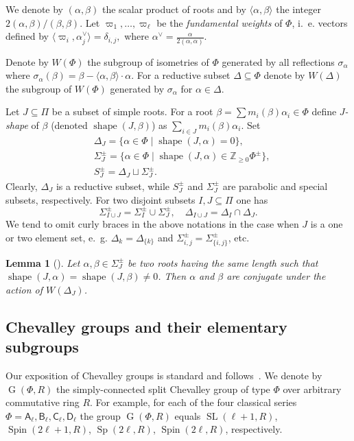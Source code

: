 \documentclass[12pt]{amsart}
\theoremstyle{plain}
\numberwithin{equation}{section}
\newtheorem{lemma}{Lemma}
\numberwithin{lemma}{section}
\theoremstyle{definition}
\theoremstyle{remark}
\DeclareMathOperator{\G}{G}
\DeclareMathOperator{\SL}{SL}
\DeclareMathOperator{\Sp}{Sp}
\DeclareMathOperator{\shape}{shape}
\DeclareMathOperator{\Spin}{Spin}
\newcommand{\rA}{\mathsf{A}}
\newcommand{\rB}{\mathsf{B}}
\newcommand{\rC}{\mathsf{C}}
\newcommand{\rD}{\mathsf{D}}
\begin{document}
We denote by $(\alpha, \beta)$ the scalar product of roots and by $\langle \alpha, \beta\rangle$ the integer $2(\alpha, \beta)/(\beta, \beta)$.
Let $\varpi_1, \ldots, \varpi_\ell$ be the \emph{fundamental weights }of $\Phi$, i.\, e. vectors
defined by $\langle\varpi_i, \alpha_j^\vee\rangle=\delta_{i, j}, $ where $\alpha^\vee = \frac{\alpha}{2(\alpha, \alpha)}$.

Denote by $W(\Phi)$ the subgroup of isometries of $\Phi$ generated by all reflections $\sigma_\alpha$ where $\sigma_\alpha(\beta)=\beta-\langle\alpha, \beta \rangle\cdot \alpha$.
For a reductive subset $\Delta\subseteq \Phi$ denote by $W(\Delta)$ the subgroup of $W(\Phi)$ generated by $\sigma_\alpha$ for $\alpha\in\Delta$.

Let $J\subseteq \Pi$ be a subset of simple roots. 
For a root $\beta = \sum m_i(\beta)\alpha_i \in \Phi$ define \emph{$J$-shape} of $\beta$ (denoted $\shape(J, \beta)$) as $\sum_{i\in J} m_i(\beta) \alpha_i$.
Set
\begin{align*}
& \Delta_J = \{\alpha \in \Phi \mid \shape(J, \alpha)=0\}, \\
& \Sigma^\pm_J = \{\alpha \in \Phi \mid \shape(J, \alpha) \in \mathbb{Z}_{\geqslant0} \Phi^\pm \}, \\
& S_J^\pm = \Delta_J \sqcup \Sigma_J^\pm.
\end{align*}
Clearly, $\Delta_J$ is a reductive subset, while $S^\pm_J$ and $\Sigma^\pm_J$ are parabolic and special subsets, respectively.
For two disjoint subsets $I, J\subseteq \Pi$ one has 
\[ \Sigma^\pm_{I \cup J} = \Sigma^\pm_I\cup\Sigma^\pm_J, \quad \Delta_{I\cup J} = \Delta_I \cap \Delta_J. \]
We tend to omit curly braces in the above notations in the case when $J$ is a one or two element set, e.\, g. $\Delta_k=\Delta_{\{k\}}$ and $\Sigma_{i, j}^\pm=\Sigma_{\{i, j\}}^\pm$, etc.

\begin{lemma}[{\cite[Lemma~1]{ABS}}]\label{lemma:abs}
Let $\alpha, \beta \in \Sigma^\pm_J$ be two roots having the same length such that $\shape(J, \alpha)=\shape(J, \beta)\neq 0$.
Then $\alpha$ and $\beta$ are conjugate under the action of $W(\Delta_J)$.
\end{lemma}

\subsection{Chevalley groups and their elementary subgroups} \label{sec:elementary}
Our exposition of Chevalley groups is standard and follows~\cite{Ta, S, St78, VP, Va86}.
We denote by $\G(\Phi, R)$ the simply-connected split Chevalley group of type $\Phi$ over arbitrary commutative ring $R$. For example, for each of the four classical series $\Phi=\rA_\ell, \rB_\ell, \rC_\ell, \rD_\ell$
the group $\G(\Phi, R)$ equals $\SL(\ell+1, R)$, $\Spin(2\ell+1, R)$, $\Sp(2\ell, R)$, $\Spin(2\ell, R)$, respectively. 
\end{document}
